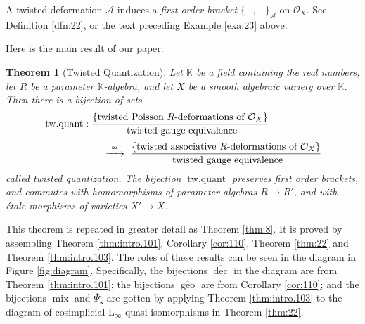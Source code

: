 \documentclass[a4paper, 10pt]{amsart}
\newtheorem{thm}[equation]{Theorem}
\theoremstyle{definition}
\numberwithin{equation}{section}
\newcommand{\xar}{\xrightarrow}
\newcommand{\opn}{\operatorname}
\newcommand{\ol}{\overline}
\newcommand{\mcal}[1]{\mathcal{#1}}
\newcommand{\mrm}[1]{\mathrm{#1}}
\newcommand{\mbb}[1]{\mathbb{#1}}
\newcommand{\tup}[1]{\textup{#1}}
\newcommand{\bsym}[1]{\boldsymbol{#1}}
\newcommand{\K}{\mbb{K}}
\newcommand{\gerbe}[1]{\bsym{\mcal{#1}}}
\begin{document}
A twisted deformation $\gerbe{A}$ induces a {\em first order bracket}
$\{ -,- \}_{\gerbe{A}}$ on $\mcal{O}_X$.
See Definition \ref{dfn:22}, or the text preceding Example \ref{exa:23} above.

Here is the main result of our paper:

\begin{thm}[Twisted Quantization] \label{thm:14}
Let $\K$ be a field containing the real numbers, let $R$ be a 
parameter $\K$-algebra, and let $X$ be a smooth algebraic variety over
$\K$. Then there is a bijection of sets
\[ \begin{aligned}
& \opn{tw{.}quant} : 
\frac{ \{ \tup{twisted Poisson $R$-deformations of 
$\mcal{O}_X$} \} }
{\tup{ twisted gauge equivalence}} \\[0.3em]
& \hspace{14ex} \xar{\ \cong \ }  \
\frac{ \{ \tup{twisted associative $R$-deformations of 
$\mcal{O}_X$} \} }
{\tup{ twisted gauge equivalence}}
\end{aligned} \] 
called {\em twisted quantization}. 
The bijection $\opn{tw{.}quant}$ preserves first order brackets, and commutes
with homomorphisms of parameter algebras $R \to R'$, and with  \'etale morphisms
of varieties $X' \to X$.
\end{thm}

This theorem is repeated in greater detail as Theorem \ref{thm:8}.
It is proved by assembling Theorem \ref{thm:intro.101}, Corollary
\ref{cor:110}, Theorem \ref{thm:22} and Theorem \ref{thm:intro.103}.
The roles of these results can be seen in the diagram in Figure 
\ref{fig:diagram}. 
Specifically, the  bijections $\ol{\opn{dec}}$ in the diagram are from 
Theorem \ref{thm:intro.101}; the  bijections $\ol{\opn{geo}}$ are from 
Corollary \ref{cor:110}; and the bijections 
$\ol{\opn{mix}}$ and $\ol{\Psi}_{\bsym{s}}$ are gotten by applying 
Theorem \ref{thm:intro.103} to the diagram of cosimplicial 
$\mrm{L}_{\infty}$ quasi-isomorphisms in Theorem \ref{thm:22}.
\end{document}

